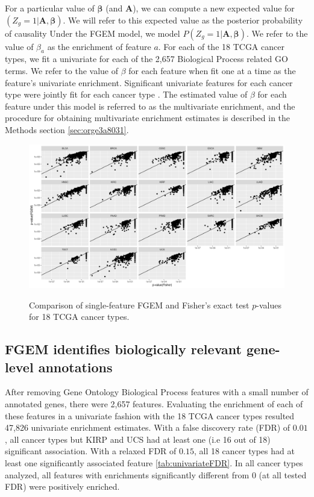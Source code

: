 For a particular value of $\boldsymbol{\beta}$ (and $\textbf{A}$), we can compute a new expected value for $(Z_g = 1 | \textbf{A},\boldsymbol{\beta})$.  We will refer to this expected value as the posterior probability of causality      Under the FGEM model, we model $P(Z_g = 1 | \textbf{A},\boldsymbol{\beta})$.  We refer to the value of $\beta_a$ as the enrichment of feature $a$.  For each of the 18 TCGA cancer types, we fit a univariate for each of the 2,657 Biological Process related GO terms.  We refer to the value of $\beta$ for each feature when fit one at a time as the feature's univariate enrichment.  Significant univariate features for each cancer type were jointly fit for each cancer type .  The estimated value of $\beta$ for each feature under this model is referred to as the multivariate enrichment, and the procedure for obtaining multivariate enrichment estimates is described in the Methods section \ref{sec:orge3a8031}.

\begin{figure}
\centering
\includegraphics[width=.9\linewidth]{img/fisher_vs_fgem.png}\label{fig:fisher_vs_fgem}
\caption{Comparison of single-feature FGEM and Fisher's exact test $p$-values for 18 TCGA cancer types.}
\end{figure}

\subsection{FGEM identifies biologically relevant gene-level annotations}\label{sec:orgd52f2ca}

After removing Gene Ontology Biological Process features with a small number of annotated genes, there were 2,657 features.  Evaluating the enrichment of each of these features in a univariate fashion with the 18 TCGA cancer types resulted 47,826 univariate enrichment estimates.  With a false discovery rate (FDR) of $0.01$, all cancer types but KIRP and UCS had at least one (i.e 16 out of 18) significant association.  With a relaxed FDR of $0.15$, all 18 cancer types had at least one significantly associated feature \ref{tab:univariateFDR}. In all cancer types analyzed, all features with enrichments significantly different from 0 (at all tested FDR)  were positively enriched.  


